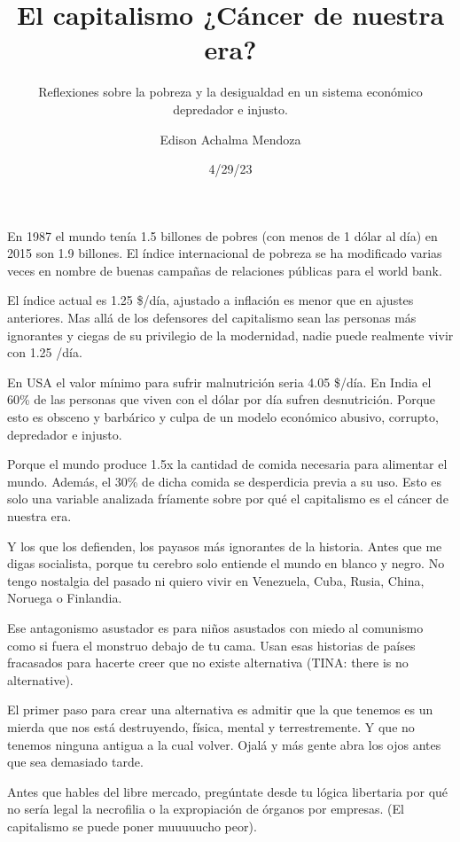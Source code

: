 \documentclass[
  a2paper,
]{article}
\title{El capitalismo ¿Cáncer de nuestra era?}
\subtitle{Reflexiones sobre la pobreza y la desigualdad en un sistema
económico depredador e injusto.}
\author{Edison Achalma Mendoza}
\date{4/29/23}
\renewcommand*\contentsname{Table of contents}
\newcommand\contentsname{Table of contents}
\begin{document}
\maketitle
\ifdefined\Shaded\renewenvironment{Shaded}{\begin{tcolorbox}[breakable, borderline west={3pt}{0pt}{shadecolor}, sharp corners, boxrule=0pt, enhanced, frame hidden, interior hidden]}{\end{tcolorbox}}\fi

\renewcommand*\contentsname{Contenidos}
{
\hypersetup{linkcolor=}
\setcounter{tocdepth}{1}
\tableofcontents
}
\listoffigures
\listoftables
En 1987 el mundo tenía 1.5 billones de pobres (con menos de 1 dólar al
día) en 2015 son 1.9 billones. El índice internacional de pobreza se ha
modificado varias veces en nombre de buenas campañas de relaciones
públicas para el world bank.

El índice actual es 1.25 \$/día, ajustado a inflación es menor que en
ajustes anteriores. Mas allá de los defensores del capitalismo sean las
personas más ignorantes y ciegas de su privilegio de la modernidad,
nadie puede realmente vivir con 1.25 /día.

En USA el valor mínimo para sufrir malnutrición seria 4.05 \$/día. En
India el 60\% de las personas que viven con el dólar por día sufren
desnutrición. Porque esto es obsceno y barbárico y culpa de un modelo
económico abusivo, corrupto, depredador e injusto.

Porque el mundo produce 1.5x la cantidad de comida necesaria para
alimentar el mundo. Además, el 30\% de dicha comida se desperdicia
previa a su uso. Esto es solo una variable analizada fríamente sobre por
qué el capitalismo es el cáncer de nuestra era.

Y los que los defienden, los payasos más ignorantes de la historia.
Antes que me digas socialista, porque tu cerebro solo entiende el mundo
en blanco y negro. No tengo nostalgia del pasado ni quiero vivir en
Venezuela, Cuba, Rusia, China, Noruega o Finlandia.

Ese antagonismo asustador es para niños asustados con miedo al comunismo
como si fuera el monstruo debajo de tu cama. Usan esas historias de
países fracasados para hacerte creer que no existe alternativa (TINA:
there is no alternative).

El primer paso para crear una alternativa es admitir que la que tenemos
es un mierda que nos está destruyendo, física, mental y terrestremente.
Y que no tenemos ninguna antigua a la cual volver. Ojalá y más gente
abra los ojos antes que sea demasiado tarde.

Antes que hables del libre mercado, pregúntate desde tu lógica
libertaria por qué no sería legal la necrofilia o la expropiación de
órganos por empresas. (El capitalismo se puede poner muuuuucho peor).


\printbibliography
\end{document}
